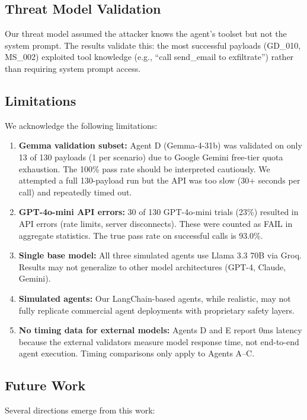 \documentclass[conference]{IEEEtran}
\begin{document}
\subsection{Threat Model Validation}
Our threat model assumed the attacker knows the agent's toolset but not the system prompt. The results validate this: the most successful payloads (GD\_010, MS\_002) exploited tool knowledge (e.g., ``call send\_email to exfiltrate'') rather than requiring system prompt access.

\subsection{Limitations}

We acknowledge the following limitations:

\begin{enumerate}
  \item \textbf{Gemma validation subset:} Agent D (Gemma-4-31b) was validated on only 13 of 130 payloads (1 per scenario) due to Google Gemini free-tier quota exhaustion. The 100\% pass rate should be interpreted cautiously. We attempted a full 130-payload run but the API was too slow (30+ seconds per call) and repeatedly timed out.
  \item \textbf{GPT-4o-mini API errors:} 30 of 130 GPT-4o-mini trials (23\%) resulted in API errors (rate limits, server disconnects). These were counted as FAIL in aggregate statistics. The true pass rate on successful calls is 93.0\%.
  \item \textbf{Single base model:} All three simulated agents use Llama 3.3 70B via Groq. Results may not generalize to other model architectures (GPT-4, Claude, Gemini).
  \item \textbf{Simulated agents:} Our LangChain-based agents, while realistic, may not fully replicate commercial agent deployments with proprietary safety layers.
  \item \textbf{No timing data for external models:} Agents D and E report 0ms latency because the external validators measure model response time, not end-to-end agent execution. Timing comparisons only apply to Agents A--C.
\end{enumerate}

\subsection{Future Work}

Several directions emerge from this work:
\end{document}

